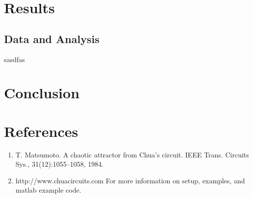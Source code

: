 \documentclass[12pt]{article}
\begin{document}
\section{Results}
        \subsection{Data and Analysis}
        sasdfas


\section{Conclusion}


\section{References}
    \begin{enumerate}
        \sloppy
        \item  T. Matsumoto. A chaotic attractor from Chua’s circuit. IEEE Trans. Circuits Sys., 31(12):1055–1058, 1984.
        \item  http://www.chuacircuits.com For more information on setup, examples, and matlab example code.

    \end{enumerate}
\end{document}
